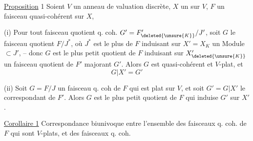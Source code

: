 \noindent\hfill{}

\uline{Proposition} 1 Soient $V$ un anneau de valuation
discrète,  $X$ un  sur $V$, $F$ un faisceau
quasi-cohérent sur $X$, 

 (i) Pour tout faisceau quotient q. coh.
$G'=F'_{\deleted{\unsure{K}}}/J'$, soit $G$ le faisceau
quotient  $F/J^*$, où $J^*$ est le plus
 de $F$ induisant 
 sur $X'=X_K$ un  Module $\subset J'$, --
donc $G$ est le plus petit  quotient de $F$
induisant sur \unsure{$\vert$} $X'_{\deleted{\unsure{K}}}$ un  faisceau
quotient de $F'$  majorant $G'$.
Alors $G$ est quasi-cohérent et $V$-plat, et
\[
G|X'=G'
\]

(ii)  Soit $G=F/J$ un
faisceau q. coh de $F$ qui est plat sur $V$,
et soit $G'=G|X'$ le  correspondant
de $F'$. Alors $G$ est le plus petit
 quotient de $F$  qui
induise $G'$ sur $X'$.

\uline{Corollaire 1} Correspondance biunivoque entre
l'ensemble des faisceaux q. coh.  de
$F$ qui sont $V$-plats, et des faisceaux  q. coh.

